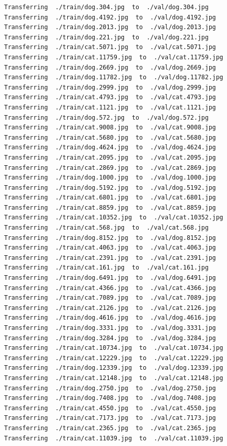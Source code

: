 \documentclass[]{book}
\theoremstyle{definition}
\theoremstyle{definition}
\theoremstyle{definition}
\theoremstyle{remark}
\begin{document}
\begin{verbatim}
Transferring  ./train/dog.304.jpg  to  ./val/dog.304.jpg
Transferring  ./train/dog.4192.jpg  to  ./val/dog.4192.jpg
Transferring  ./train/dog.2013.jpg  to  ./val/dog.2013.jpg
Transferring  ./train/dog.221.jpg  to  ./val/dog.221.jpg
Transferring  ./train/cat.5071.jpg  to  ./val/cat.5071.jpg
Transferring  ./train/cat.11759.jpg  to  ./val/cat.11759.jpg
Transferring  ./train/dog.2669.jpg  to  ./val/dog.2669.jpg
Transferring  ./train/dog.11782.jpg  to  ./val/dog.11782.jpg
Transferring  ./train/dog.2999.jpg  to  ./val/dog.2999.jpg
Transferring  ./train/cat.4793.jpg  to  ./val/cat.4793.jpg
Transferring  ./train/cat.1121.jpg  to  ./val/cat.1121.jpg
Transferring  ./train/dog.572.jpg  to  ./val/dog.572.jpg
Transferring  ./train/cat.9008.jpg  to  ./val/cat.9008.jpg
Transferring  ./train/cat.5680.jpg  to  ./val/cat.5680.jpg
Transferring  ./train/dog.4624.jpg  to  ./val/dog.4624.jpg
Transferring  ./train/cat.2095.jpg  to  ./val/cat.2095.jpg
Transferring  ./train/cat.2869.jpg  to  ./val/cat.2869.jpg
Transferring  ./train/dog.1000.jpg  to  ./val/dog.1000.jpg
Transferring  ./train/dog.5192.jpg  to  ./val/dog.5192.jpg
Transferring  ./train/cat.6801.jpg  to  ./val/cat.6801.jpg
Transferring  ./train/cat.8859.jpg  to  ./val/cat.8859.jpg
Transferring  ./train/cat.10352.jpg  to  ./val/cat.10352.jpg
Transferring  ./train/cat.568.jpg  to  ./val/cat.568.jpg
Transferring  ./train/dog.8152.jpg  to  ./val/dog.8152.jpg
Transferring  ./train/cat.4063.jpg  to  ./val/cat.4063.jpg
Transferring  ./train/cat.2391.jpg  to  ./val/cat.2391.jpg
Transferring  ./train/cat.161.jpg  to  ./val/cat.161.jpg
Transferring  ./train/dog.6491.jpg  to  ./val/dog.6491.jpg
Transferring  ./train/cat.4366.jpg  to  ./val/cat.4366.jpg
Transferring  ./train/cat.7089.jpg  to  ./val/cat.7089.jpg
Transferring  ./train/cat.2126.jpg  to  ./val/cat.2126.jpg
Transferring  ./train/dog.4616.jpg  to  ./val/dog.4616.jpg
Transferring  ./train/dog.3331.jpg  to  ./val/dog.3331.jpg
Transferring  ./train/dog.3284.jpg  to  ./val/dog.3284.jpg
Transferring  ./train/cat.10734.jpg  to  ./val/cat.10734.jpg
Transferring  ./train/cat.12229.jpg  to  ./val/cat.12229.jpg
Transferring  ./train/dog.12339.jpg  to  ./val/dog.12339.jpg
Transferring  ./train/cat.12148.jpg  to  ./val/cat.12148.jpg
Transferring  ./train/dog.2750.jpg  to  ./val/dog.2750.jpg
Transferring  ./train/dog.7408.jpg  to  ./val/dog.7408.jpg
Transferring  ./train/cat.4550.jpg  to  ./val/cat.4550.jpg
Transferring  ./train/cat.7173.jpg  to  ./val/cat.7173.jpg
Transferring  ./train/cat.2365.jpg  to  ./val/cat.2365.jpg
Transferring  ./train/cat.11039.jpg  to  ./val/cat.11039.jpg

\end{verbatim}
\end{document}
